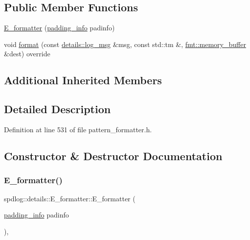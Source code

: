 \subsection*{Public Member Functions}
\begin{DoxyCompactItemize}
\item 
\hyperlink{classspdlog_1_1details_1_1_e__formatter_a6965aa5fe03beb42c5b360b56ca4dc54}{E\+\_\+formatter} (\hyperlink{structspdlog_1_1details_1_1padding__info}{padding\+\_\+info} padinfo)
\item 
void \hyperlink{classspdlog_1_1details_1_1_e__formatter_a133d1ba939b743041a036eb16c2c524a}{format} (const \hyperlink{structspdlog_1_1details_1_1log__msg}{details\+::log\+\_\+msg} \&msg, const std\+::tm \&, \hyperlink{format_8h_a21cbf729f69302f578e6db21c5e9e0d2}{fmt\+::memory\+\_\+buffer} \&dest) override
\end{DoxyCompactItemize}
\subsection*{Additional Inherited Members}


\subsection{Detailed Description}


Definition at line 531 of file pattern\+\_\+formatter.\+h.



\subsection{Constructor \& Destructor Documentation}
\mbox{\label{classspdlog_1_1details_1_1_e__formatter_a6965aa5fe03beb42c5b360b56ca4dc54}} 
\subsubsection{\texorpdfstring{E\+\_\+formatter()}{E\_formatter()}}
{\footnotesize\ttfamily spdlog\+::details\+::\+E\+\_\+formatter\+::\+E\+\_\+formatter (\begin{DoxyParamCaption}\item[{\hyperlink{structspdlog_1_1details_1_1padding__info}{padding\+\_\+info}}]{padinfo }\end{DoxyParamCaption})\hspace{0.3cm}{\ttfamily [inline]}, {\ttfamily [explicit]}}



